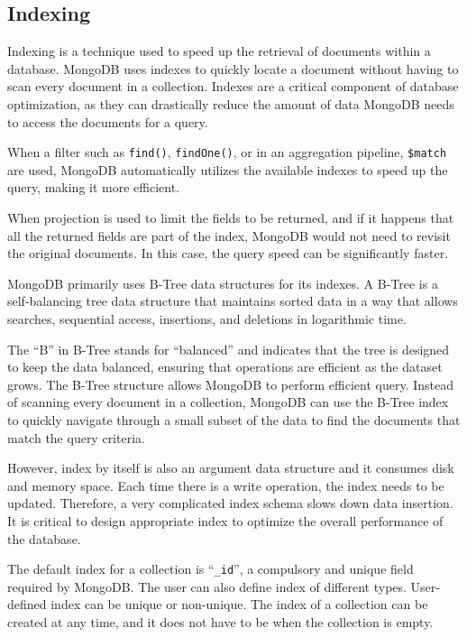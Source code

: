 \subsection{Indexing}

Indexing is a technique used to speed up the retrieval of documents within a database. MongoDB uses indexes to quickly locate a document without having to scan every document in a collection. Indexes are a critical component of database optimization, as they can drastically reduce the amount of data MongoDB needs to access the documents for a query. 

When a filter such as \verb|find()|, \verb|findOne()|, or in an aggregation pipeline, \verb|$match| are used, MongoDB automatically utilizes the available indexes to speed up the query, making it more efficient.

When projection is used to limit the fields to be returned, and if it happens that all the returned fields are part of the index, MongoDB would not need to revisit the original documents. In this case, the query speed can be significantly faster.

\begin{shortbox}

MongoDB primarily uses B-Tree data structures for its indexes. A B-Tree is a self-balancing tree data structure that maintains sorted data in a way that allows searches, sequential access, insertions, and deletions in logarithmic time. 

The ``B'' in B-Tree stands for ``balanced'' and indicates that the tree is designed to keep the data balanced, ensuring that operations are efficient as the dataset grows. The B-Tree structure allows MongoDB to perform efficient query. Instead of scanning every document in a collection, MongoDB can use the B-Tree index to quickly navigate through a small subset of the data to find the documents that match the query criteria.
\end{shortbox}

However, index by itself is also an argument data structure and it consumes disk and memory space. Each time there is a write operation, the index needs to be updated. Therefore, a very complicated index schema slows down data insertion. It is critical to design appropriate index to optimize the overall performance of the database.

The default index for a collection is ``\verb|_id|'', a compulsory and unique field required by MongoDB. The user can also define index of different types. User-defined index can be unique or non-unique. The index of a collection can be created at any time, and it does not have to be when the collection is empty.

